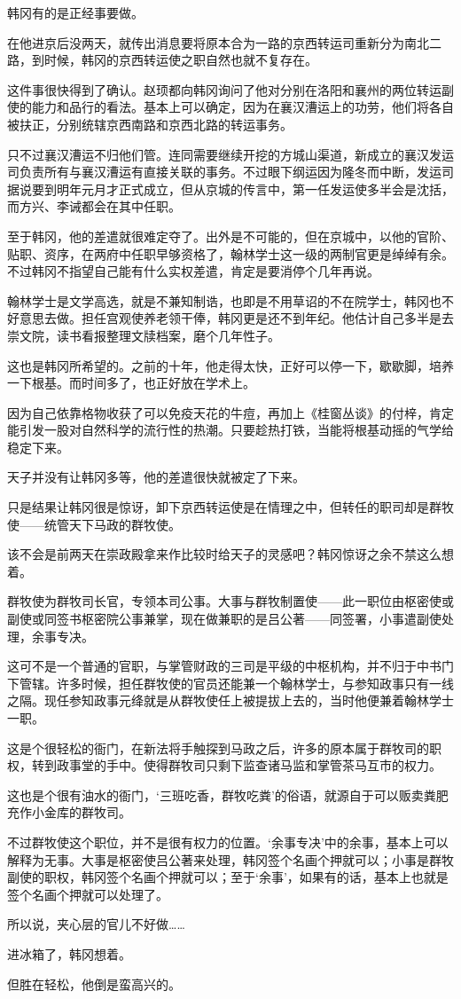 韩冈有的是正经事要做。

在他进京后没两天，就传出消息要将原本合为一路的京西转运司重新分为南北二路，到时候，韩冈的京西转运使之职自然也就不复存在。

这件事很快得到了确认。赵顼都向韩冈询问了他对分别在洛阳和襄州的两位转运副使的能力和品行的看法。基本上可以确定，因为在襄汉漕运上的功劳，他们将各自被扶正，分别统辖京西南路和京西北路的转运事务。

只不过襄汉漕运不归他们管。连同需要继续开挖的方城山渠道，新成立的襄汉发运司负责所有与襄汉漕运有直接关联的事务。不过眼下纲运因为隆冬而中断，发运司据说要到明年元月才正式成立，但从京城的传言中，第一任发运使多半会是沈括，而方兴、李诫都会在其中任职。

至于韩冈，他的差遣就很难定夺了。出外是不可能的，但在京城中，以他的官阶、贴职、资序，在两府中任职早够资格了，翰林学士这一级的两制官更是绰绰有余。不过韩冈不指望自己能有什么实权差遣，肯定是要消停个几年再说。

翰林学士是文学高选，就是不兼知制诰，也即是不用草诏的不在院学士，韩冈也不好意思去做。担任宫观使养老领干俸，韩冈更是还不到年纪。他估计自己多半是去崇文院，读书看报整理文牍档案，磨个几年性子。

这也是韩冈所希望的。之前的十年，他走得太快，正好可以停一下，歇歇脚，培养一下根基。而时间多了，也正好放在学术上。

因为自己依靠格物收获了可以免疫天花的牛痘，再加上《桂窗丛谈》的付梓，肯定能引发一股对自然科学的流行性的热潮。只要趁热打铁，当能将根基动摇的气学给稳定下来。

天子并没有让韩冈多等，他的差遣很快就被定了下来。

只是结果让韩冈很是惊讶，卸下京西转运使是在情理之中，但转任的职司却是群牧使——统管天下马政的群牧使。

该不会是前两天在崇政殿拿来作比较时给天子的灵感吧？韩冈惊讶之余不禁这么想着。

群牧使为群牧司长官，专领本司公事。大事与群牧制置使——此一职位由枢密使或副使或同签书枢密院公事兼掌，现在做兼职的是吕公著——同签署，小事遣副使处理，余事专决。

这可不是一个普通的官职，与掌管财政的三司是平级的中枢机构，并不归于中书门下管辖。许多时候，担任群牧使的官员还能兼一个翰林学士，与参知政事只有一线之隔。现任参知政事元绛就是从群牧使任上被提拔上去的，当时他便兼着翰林学士一职。

这是个很轻松的衙门，在新法将手触探到马政之后，许多的原本属于群牧司的职权，转到政事堂的手中。使得群牧司只剩下监查诸马监和掌管茶马互市的权力。

这也是个很有油水的衙门，‘三班吃香，群牧吃粪’的俗语，就源自于可以贩卖粪肥充作小金库的群牧司。

不过群牧使这个职位，并不是很有权力的位置。‘余事专决’中的余事，基本上可以解释为无事。大事是枢密使吕公著来处理，韩冈签个名画个押就可以；小事是群牧副使的职权，韩冈签个名画个押就可以；至于‘余事’，如果有的话，基本上也就是签个名画个押就可以处理了。

所以说，夹心层的官儿不好做……

进冰箱了，韩冈想着。

但胜在轻松，他倒是蛮高兴的。


